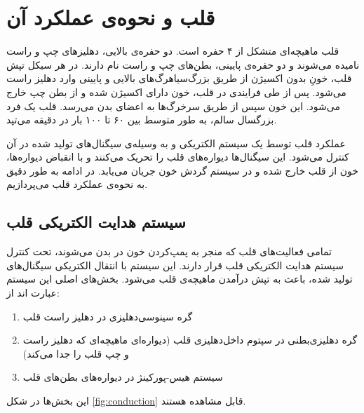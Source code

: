 \label{chap:lit}
\pagebreak

\section {قلب و نحوه‌ی عملکرد آن}
قلب ماهیچه‌ای متشکل از ۴ حفره است. دو حفره‌ی بالایی، دهلیزهای چپ و راست نامیده می‌شوند و دو حفره‌ی پایینی، بطن‌های چپ و راست نام دارند. در هر سیکل تپش قلب، خونِ بدون اکسیژن از طریق بزرگ‌سیاهرگ‌های بالایی و پایینی وارد دهلیز راست می‌شود. پس از طی فرایندی در قلب، خون دارای اکسیژن شده و از بطن چپ خارج می‌شود. این خون سپس از طریق سرخرگ‌ها به اعضای بدن می‌رسد. قلب یک فرد بزرگسال سالم، به طور متوسط بین ۶۰ تا ۱۰۰ بار در دقیقه می‌تپد. \cite{MayoClinic}

عملکرد قلب توسط یک سیستم الکتریکی و به وسیله‌ی سیگنال‌های تولید شده در آن کنترل می‌شود. این سیگنال‌ها دیواره‌های قلب را تحریک می‌کنند و با انقباض دیواره‌ها، خون از قلب خارج شده و در سیستم گردش خون جریان می‌یابد. در ادامه به طور دقیق به نحوه‌ی عملکرد قلب می‌پردازیم. 


\subsection {سیستم هدایت الکتریکی قلب}
تمامی فعالیت‌های قلب که منجر به پمپ‌کردن خون در بدن می‌شوند، تحت کنترل سیستم هدایت الکتریکی قلب قرار دارند. این سیستم با انتقال الکتریکی سیگنال‌های تولید شده، باعث به تپش درآمدن ماهیچه‌ی قلب می‌شود. بخش‌های اصلی این سیستم عبارت اند از:

\begin{enumerate}
	\item گره سینوسی‌دهلیزی  در دهلیز 
	راست قلب
	\item گره دهلیزی‌بطنی  در سپتوم داخل‌دهلیزی قلب (دیواره‌ای ماهیچه‌ای که دهلیز راست و چپ قلب را جدا می‌کند)
	\item سیستم هیس-پورکینژ در دیواره‌های بطن‌های قلب
\end{enumerate}
این بخش‌ها در شکل \ref{fig:conduction} قابل مشاهده هستند.

